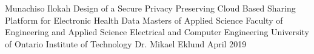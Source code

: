 

\graphicspath{{./images/}}

\usepackage{hyperref}
\hypersetup{
    colorlinks,
    citecolor=black,
    filecolor=black,
    linkcolor=black,
    urlcolor=black
}



\thesisTitle
  {Munachiso Ilokah}
  {Design of a Secure Privacy Preserving Cloud Based Sharing Platform for Electronic Health Data}
  {Masters of Applied Science}
  {Faculty of Engineering and Applied Science}
  {Electrical and Computer Engineering}
  {University of Ontario Institute of Technology}
  {Dr. Mikael Eklund}
  {April}
  {2019}




\singlespacing
\tableofcontents
\listoffigures
\listoftables
\printglossary[style=list]
\clearpage
\doublespacing
















%


